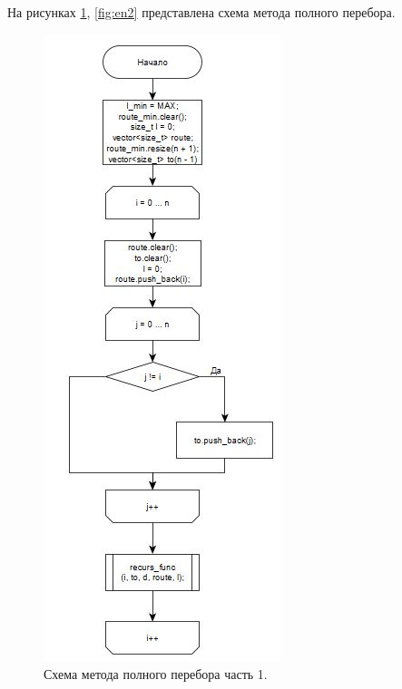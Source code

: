 \documentclass[a4paper,oneside,14pt]{extreport}
\begin{document}
На рисунках \ref{fig:en1}, \ref{fig:en2} представлена схема метода полного перебора.
\begin{figure}[H]
	\begin{center}
		\includegraphics[scale=1]{images/enumeration1.png}
		\caption{Схема метода полного перебора часть 1.}
		\label{fig:en1}
	\end{center}
\end{figure}
\end{document}
